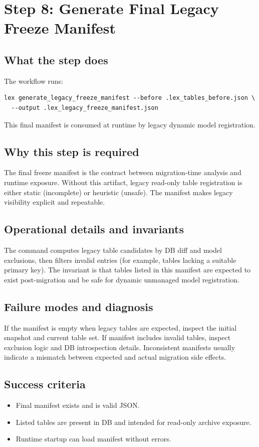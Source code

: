 \documentclass[11pt,a4paper]{article}
\begin{document}
\newpage
\section{Step 8: Generate Final Legacy Freeze Manifest}
\subsection*{What the step does}
The workflow runs:
\begin{verbatim}
lex generate_legacy_freeze_manifest --before .lex_tables_before.json \
  --output .lex_legacy_freeze_manifest.json
\end{verbatim}
This final manifest is consumed at runtime by legacy dynamic model registration.

\subsection*{Why this step is required}
The final freeze manifest is the contract between migration-time analysis and runtime
exposure. Without this artifact, legacy read-only table registration is either static
(incomplete) or heuristic (unsafe). The manifest makes legacy visibility explicit and
repeatable.

\subsection*{Operational details and invariants}
The command computes legacy table candidates by DB diff and model exclusions, then filters
invalid entries (for example, tables lacking a suitable primary key). The invariant is that
tables listed in this manifest are expected to exist post-migration and be safe for dynamic
unmanaged model registration.

\subsection*{Failure modes and diagnosis}
If the manifest is empty when legacy tables are expected, inspect the initial snapshot and
current table set. If manifest includes invalid tables, inspect exclusion logic and DB
introspection details. Inconsistent manifests usually indicate a mismatch between expected and
actual migration side effects.

\subsection*{Success criteria}
\begin{itemize}[leftmargin=1.5em]
  \item Final manifest exists and is valid JSON.
  \item Listed tables are present in DB and intended for read-only archive exposure.
  \item Runtime startup can load manifest without errors.
\end{itemize}
\end{document}
